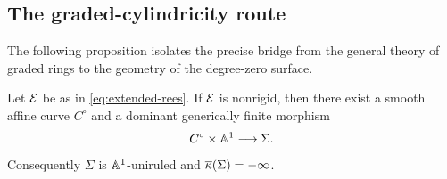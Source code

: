 \subsection{The graded-cylindricity route}

The following proposition isolates the precise bridge from the general theory of graded rings to the geometry of the degree-zero surface.

\begin{proposition}\label{prop:rees-cylinder}
Let $\mathcal E$ be as in \eqref{eq:extended-rees}.  If $\mathcal E$ is nonrigid, then there exist a smooth affine curve $C^{\circ}$ and a dominant generically finite morphism
\[
  C^{\circ}\times\mathbb A^1\longrightarrow\Sigma.
\]
Consequently $\Sigma$ is $\mathbb A^1$-uniruled and $\overline\kappa(\Sigma)=-\infty$.
\end{proposition}

